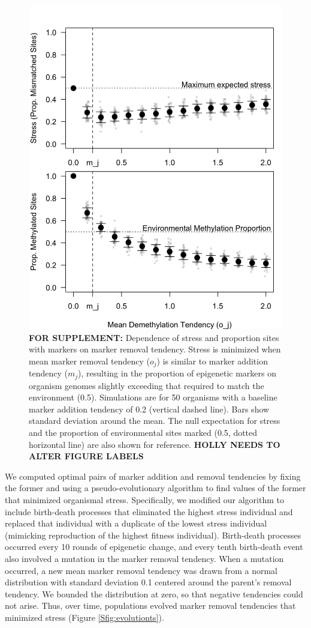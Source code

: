 \documentclass{article}
\begin{document}
\begin{figure}
    \centering
    \includegraphics[width=0.8 \textwidth]{Figures/Fig_DemethDependence.png}
    \caption{\textbf{FOR SUPPLEMENT:} Dependence of stress and proportion sites with markers on marker removal tendency. Stress is minimized when mean marker removal tendency ($o_j$) is similar to marker addition tendency ($m_j$), resulting in the proportion of epigenetic markers on organism genomes slightly exceeding that required to match the environment (0.5). Simulations are for 50 organisms with a baseline marker addition tendency of 0.2 (vertical dashed line). Bars show standard deviation around the mean. The null expectation for stress and the proportion of environmental sites marked (0.5, dotted horizontal line) are also shown for reference. \textbf{HOLLY NEEDS TO ALTER FIGURE LABELS}}
    \label{fig:methylmismatch}
\end{figure}

We computed optimal pairs of marker addition and removal tendencies by fixing the former and using a pseudo-evolutionary algorithm to find values of the former that minimized organismal stress. Specifically, we modified our algorithm to include birth-death processes that eliminated the highest stress individual and replaced that individual with a duplicate of the lowest stress individual (mimicking reproduction of the highest fitness individual). Birth-death processes occurred every 10 rounds of epigenetic change, and every tenth birth-death event also involved a mutation in the marker removal tendency. When a mutation occurred, a new mean marker removal tendency was drawn from a normal distribution with standard deviation 0.1 centered around the parent's removal tendency. We bounded the distribution at zero, so that negative tendencies could not arise. Thus, over time, populations evolved marker removal tendencies that minimized stress (Figure \ref{Sfig:evolutionts}). %
\end{document}
